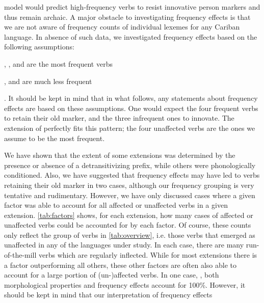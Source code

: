  model would predict high-frequency verbs to resist innovative person markers and thus remain archaic.
A major obstacle to investigating frequency effects is that we are not aware of frequency counts of individual lexemes for any Cariban language.
In absence of such data, we investigated frequency effects based on the following assumptions:
\begin{inlinelist}
	\item {}, , and  are the most frequent  verbs
	\item {},  and  are much less frequent
\end{inlinelist}.
It should be kept in mind that in what follows, any statements about frequency effects are based on these assumptions.
One would expect the four frequent verbs to retain their old marker, and the three infrequent ones to innovate.
The extension of \PWai {} perfectly fits this pattern; the four unaffected  verbs are the ones we assume to be the most frequent.

We have shown that the extent of some extensions was determined by the presence or absence of a detransitivizing prefix, while others were phonologically conditioned.
Also, we have suggested that frequency effects may have led to verbs retaining their old marker in two cases, although our frequency grouping is very tentative and rudimentary.
However, we have only discussed cases where a given factor was able to account for all affected or unaffected verbs in a given extension.
\cref{tab:factors} shows, for each extension, how many cases of affected or unaffected verbs could be accounted for by each factor.
Of course, these counts only reflect the group of verbs in \cref{tab:overview}, i.e. those verbs that emerged as unaffected in any of the languages under study.
In each case, there are many run-of-the-mill  verbs which are regularly inflected.
While for most extensions there is a factor outperforming all others, these other factors are often also able to account for a large portion of (un-)affected verbs.
In one case, \PWai, both morphological properties and frequency effects account for 100\%.
However, it should be kept in mind that our interpretation of frequency effects

